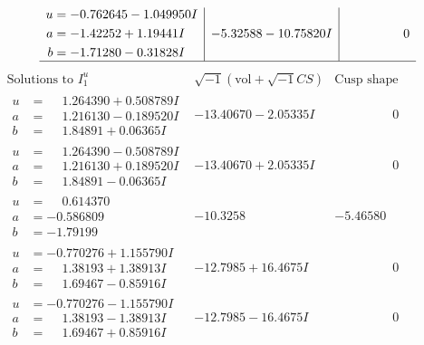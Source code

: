 \documentclass[1p]{elsarticle_modified}
\theoremstyle{definition}
\newcommand{\I}{\sqrt{-1}}
\begin{document}
$$\begin{array}{c|c|c}
\begin{aligned}
u &= -0.762645 - 1.049950 I \\
a &= -1.42252 + 1.19441 I \\
b &= -1.71280 - 0.31828 I\end{aligned}
 & -5.32588 - 10.75820 I & \phantom{-0.000000 } 0\\
 \hline 
 \end{array}$$\newpage$$\begin{array}{c|c|c}  
\text{Solutions to }I^u_{1}& \I (\text{vol} + \sqrt{-1}CS) & \text{Cusp shape}\\
 \hline 
\begin{aligned}
u &= \phantom{-}1.264390 + 0.508789 I \\
a &= \phantom{-}1.216130 - 0.189520 I \\
b &= \phantom{-}1.84891 + 0.06365 I\end{aligned}
 & -13.40670 - 2.05335 I & \phantom{-0.000000 } 0 \\ \hline\begin{aligned}
u &= \phantom{-}1.264390 - 0.508789 I \\
a &= \phantom{-}1.216130 + 0.189520 I \\
b &= \phantom{-}1.84891 - 0.06365 I\end{aligned}
 & -13.40670 + 2.05335 I & \phantom{-0.000000 } 0 \\ \hline\begin{aligned}
u &= \phantom{-}0.614370\phantom{ +0.000000I} \\
a &= -0.586809\phantom{ +0.000000I} \\
b &= -1.79199\phantom{ +0.000000I}\end{aligned}
 & -10.3258\phantom{ +0.000000I} & -5.46580\phantom{ +0.000000I} \\ \hline\begin{aligned}
u &= -0.770276 + 1.155790 I \\
a &= \phantom{-}1.38193 + 1.38913 I \\
b &= \phantom{-}1.69467 - 0.85916 I\end{aligned}
 & -12.7985 + 16.4675 I & \phantom{-0.000000 } 0 \\ \hline\begin{aligned}
u &= -0.770276 - 1.155790 I \\
a &= \phantom{-}1.38193 - 1.38913 I \\
b &= \phantom{-}1.69467 + 0.85916 I\end{aligned}
 & -12.7985 - 16.4675 I & \phantom{-0.000000 } 0 \\ \hline\begin{aligned}

\end{aligned}
\end{array}$$
\end{document}
